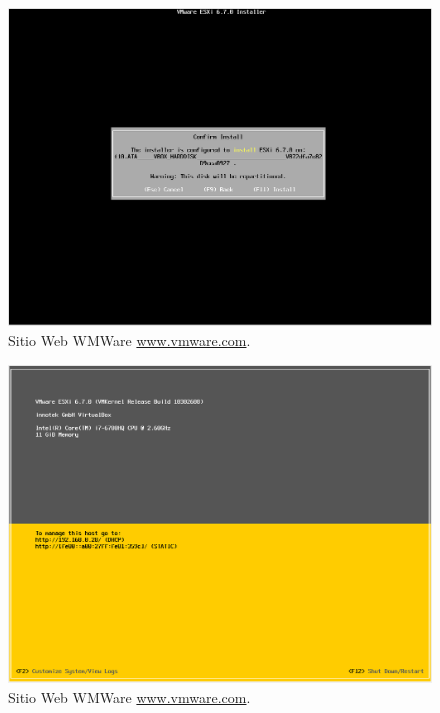 \begin{figure}[!hbtp]
	\centering
	\includegraphics[width=\linewidth]{Trabajo/RecursosEducativos/RE01_VMwareESXi/RE_VMwareInstalacion13.png}
	\vspace{-0.2cm}
	\caption{Sitio Web WMWare \url{www.vmware.com}.\footnotemark[2]{} }
	\label{fig:VMwareInstalacion13}
\end{figure}


\begin{figure}[!hbtp]
	\centering
	\includegraphics[width=\linewidth]{Trabajo/RecursosEducativos/RE01_VMwareESXi/RE_VMwareInstalacion14.png}
	\vspace{-0.2cm}
	\caption{Sitio Web WMWare \url{www.vmware.com}.\footnotemark[2]{} }
	\label{fig:VMwareInstalacion14}
\end{figure}


